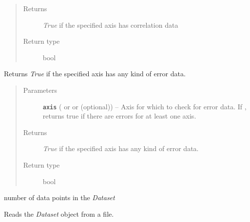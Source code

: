 \documentclass[a4paper,10pt,english]{sphinxmanual}
\begin{document}
\begin{fulllineitems}
\begin{fulllineitems}
\begin{quote}
\begin{description}
\item[{Returns}] \leavevmode
\emph{True} if the specified axis has correlation data

\item[{Return type}] \leavevmode
bool

\end{description}\end{quote}

\end{fulllineitems}


\begin{fulllineitems}
\label{index:kafe.dataset.Dataset.has_errors}
Returns \emph{True} if the specified axis has any kind of error data.
\begin{quote}\begin{description}
\item[{Parameters}] \leavevmode
\textbf{\texttt{axis}} ( or  or  (optional)) -- Axis for which to check for error data. If ,
returns true if there are errors for at least one axis.

\item[{Returns}] \leavevmode
\emph{True} if the specified axis has any kind of error data.

\item[{Return type}] \leavevmode
bool

\end{description}\end{quote}

\end{fulllineitems}


\begin{fulllineitems}
\label{index:kafe.dataset.Dataset.n_datapoints}
number of data points in the \emph{Dataset}

\end{fulllineitems}


\begin{fulllineitems}
\label{index:kafe.dataset.Dataset.read_from_file}
Reads the \emph{Dataset} object from a file.


\end{fulllineitems}
\end{fulllineitems}
\end{document}
